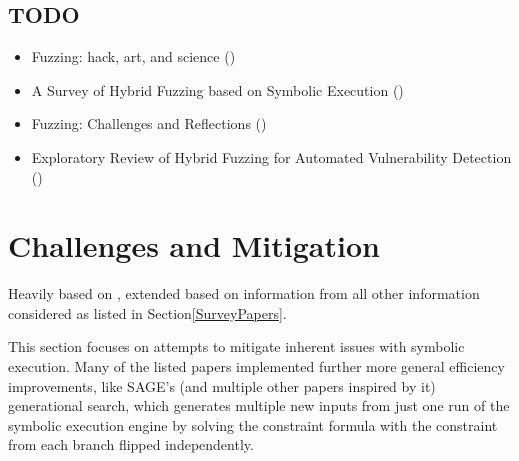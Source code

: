 \documentclass{article}
\begin{document}
\begin{multicols}{2}
    \subsection{TODO}
    \begin{itemize}
        \item    Fuzzing: hack, art, and science ()\cite{HackArtScience}
        \item    A Survey of Hybrid Fuzzing based on Symbolic Execution ()\cite{SurveyHybrid}
        \item    Fuzzing: Challenges and Reflections ()\cite{ChallengesAndReflections}
        \item    Exploratory Review of Hybrid Fuzzing for Automated Vulnerability Detection ()\cite{Hybrid}
    \end{itemize}

    \section{Challenges and Mitigation}
    \label{Results}
    Heavily based on \cite{ReviewThreeDecades, PreliminaryAssessment}, extended based on information from all other information considered as listed in Section\ref{SurveyPapers}.

    This section focuses on attempts to mitigate inherent issues with symbolic execution. Many of the listed papers implemented further more general efficiency improvements, like SAGE's\cite{SAGE} (and multiple other papers inspired by it) generational search, which generates multiple new inputs from just one run of the symbolic execution engine by solving the constraint formula with the constraint from each branch flipped independently.


\end{multicols}
\end{document}
